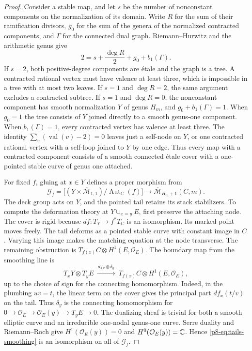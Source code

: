\begin{proof}
Consider a stable map, and let \(s\) be the number of nonconstant
components on the normalization of its domain. Write \(R\) for the
sum of their ramification divisors, \(g_0\) for the sum of the
genera of the normalized contracted components, and \(\Gamma\) for
the connected dual graph. Riemann--Hurwitz and the arithmetic genus
give
\[
             2=s+\frac{\deg R}{2}+g_0+b_1(\Gamma).
\]
If \(s=2\), both positive-degree components are \'etale and the
graph is a tree. A contracted rational vertex must have valence at
least three, which is impossible in a tree with at most two leaves.
If \(s=1\) and \(\deg R=2\), the same argument excludes a contracted
subtree. If \(s=1\) and \(\deg R=0\), the nonconstant component has
smooth normalization \(Y\) of genus \(H_m\), and \(g_0+b_1(\Gamma)=1\).
When \(g_0=1\) the tree consists of \(Y\) joined directly to a
smooth genus-one component. When \(b_1(\Gamma)=1\), every contracted
vertex has valence at least three. The identity
\(\sum_v(\operatorname{val}(v)-2)=0\) leaves just a self-node on
\(Y\), or one contracted rational vertex with a self-loop joined
to \(Y\) by one edge. Thus every map with a contracted component
consists of a smooth connected \'etale cover with a one-pointed
stable curve of genus one attached.

For fixed \(f\), gluing at \(x\in Y\) defines a proper morphism from
\[
 \mathcal G_f=
  \big[(Y\times\overline{\mathcal M}_{1,1})/\operatorname{Aut}_C(f)\big]
      \longrightarrow\overline{\mathcal M}_{H_m+1}(C,m).
\]
The deck group acts on \(Y\), and the pointed tail retains its stack
stabilizers. To compute the deformation theory at
\(Y\cup_{x=y}E\), first preserve the attaching node. The cover is
rigid because \(df:T_Y\to f^*T_C\) is an isomorphism. Its marked
point moves freely. The tail deforms as a pointed stable curve with
constant image in \(C\). Varying this image makes the matching
equation at the node transverse. The remaining obstruction is
\(T_{f(x)}C\otimes H^1(E,\mathcal O_E)\). The boundary map from
the smoothing line is
\begin{equation}\label{p8-eq:tails-smoothing}
 T_xY\otimes T_yE\ \xrightarrow{\,df_x\otimes\delta_y\,}\
 T_{f(x)}C\otimes H^1(E,\mathcal O_E),
\end{equation}
up to the choice of sign for the connecting homomorphism. Indeed,
in the plumbing \(uv=t\), the linear term on the cover gives the
principal part \(df_x(t/v)\) on the tail. Thus \(\delta_y\) is the
connecting homomorphism for
\(0\to\mathcal O_E\to\mathcal O_E(y)\to T_yE\to0\). The dualizing
sheaf is trivial for both a smooth elliptic curve and an irreducible
one-nodal genus-one curve. Serre duality and Riemann--Roch give
\(H^1(\mathcal O_E(y))=0\) and \(H^0(\mathcal O_E(y))=\mathbb C\).
Hence \eqref{p8-eq:tails-smoothing} is an isomorphism on all of
\(\mathcal G_f\).


\end{proof}
